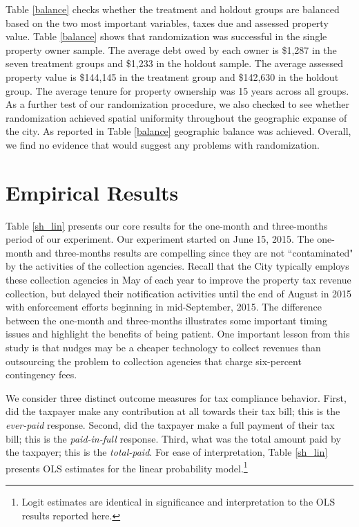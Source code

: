 \documentclass[12pt]{article}
\begin{document}
Table \ref{balance} checks whether the treatment and holdout groups
are balanced based on the two most important variables, taxes due and
assessed property value.  Table \ref{balance} shows that randomization
was successful in the single property owner sample.  The average debt
owed by each owner is \$1,287 in the seven treatment groups and \$1,233 in
the holdout sample. The average assessed property value is \$144,145
in the treatment group and \$142,630 in the holdout group. The average
tenure for property ownership was 15 years across all groups.  As a
further test of our randomization procedure, we also checked to see
whether randomization achieved spatial uniformity throughout the
geographic expanse of the city. As reported in Table \ref{balance}
geographic balance was achieved. Overall, we find no evidence that
would suggest any problems with randomization.


\section{Empirical Results}

Table \ref{sh_lin} presents our core results for the one-month and
three-months period of our experiment. Our experiment started on June
15, 2015.  The one-month and three-months results are compelling since they
are not ``contaminated" by the activities of the collection
agencies. Recall that the City typically employs these collection
agencies in May of each year to improve the property tax revenue
collection, but delayed their notification activities until the end of
August in 2015 with enforcement efforts beginning in mid-September,
2015.  The difference between the one-month and three-months
illustrates some important timing issues and highlight the benefits of
being patient.  One important lesson from this study is that nudges
may be a cheaper technology to collect revenues than outsourcing the
problem to collection agencies that charge six-percent contingency
fees.

We consider three distinct outcome measures for tax compliance
behavior. First, did the taxpayer make any contribution at all towards
their tax bill; this is the \textit{ever-paid} response. Second, did
the taxpayer make a full payment of their tax bill; this is the
\textit{paid-in-full} response. Third, what was the total amount paid
by the taxpayer; this is the \textit{total-paid}.  For ease of
interpretation, Table \ref{sh_lin} presents OLS estimates for the
linear probability model.\footnote{Logit estimates are identical
in significance and interpretation to the OLS results reported here.}
\end{document}
